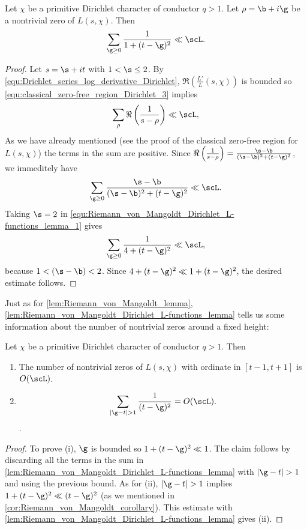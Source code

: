       \begin{lemma}\label{lem:Riemann_von_Mangoldt_Dirichlet_L-functions_lemma}
        Let $\chi$ be a primitive Dirichlet character of conductor $q > 1$. Let $\rho = \b+i\g$ be a nontrivial zero of $L(s,\chi)$. Then
        \[
          \sum_{\g \ge 0}\frac{1}{1+(t-\g)^{2}} \ll \scL.
        \]
      \end{lemma}
      \begin{proof}
        Let $s = \s+it$ with $1 < \s \le 2$. By \cref{equ:Drichlet_series_log_derivative_Dirichlet}, $\Re\left(\frac{L'}{L}(s,\chi)\right)$ is bounded so \cref{equ:classical_zero-free_region_Dirichlet_3} implies
        \[
          \sum_{\rho}\Re\left(\frac{1}{s-\rho}\right) \ll \scL,
        \]
        As we have already mentioned (see the proof of the classical zero-free region for $L(s,\chi)$) the terms in the sum are positive. Since $\Re\left(\frac{1}{s-\rho}\right) = \frac{\s-\b}{(\s-\b)^{2}+(t-\g)^{2}}$, we immeditely have
        \begin{equation}\label{equ:Riemann_von_Mangoldt_Dirichlet_L-functions_lemma_1}
          \sum_{\g \ge 0}\frac{\s-\b}{(\s-\b)^{2}+(t-\g)^{2}} \ll \scL.
        \end{equation}
        Taking $\s = 2$ in \cref{equ:Riemann_von_Mangoldt_Dirichlet_L-functions_lemma_1} gives
        \[
          \sum_{\g \ge 0}\frac{1}{4+(t-\g)^{2}} \ll \scL,
        \]
        because $1 < (\s-\b) < 2$. Since $4+(t-\g)^{2} \ll 1+(t-\g)^{2}$, the desired estimate follows.
      \end{proof}

      Just as for \cref{lem:Riemann_von_Mangoldt_lemma}, \cref{lem:Riemann_von_Mangoldt_Dirichlet_L-functions_lemma} tells us some information about the number of nontrivial zeros around a fixed height:

      \begin{corollary}\label{cor:Riemann_von_Mangoldt_Dirichlet_L-functions_corollary}
        Let $\chi$ be a primitive Dirichlet character of conductor $q > 1$. Then
        \begin{enumerate}[label=(\roman*)]
          \item The number of nontrivial zeros of $L(s,\chi)$ with ordinate in $[t-1,t+1]$ is $O(\scL)$.
          \item 
          \[
            \sum_{|\g-t| > 1}\frac{1}{(t-\g)^{2}} = O(\scL).
          \].
        \end{enumerate}
      \end{corollary}
      \begin{proof}
        To prove (i), $\g$ is bounded so $1+(t-\g)^{2} \ll 1$. The claim follows by discarding all the terms in the sum in \cref{lem:Riemann_von_Mangoldt_Dirichlet_L-functions_lemma} with $|\g-t| > 1$ and using the previous bound. As for (ii), $|\g-t| > 1$ implies $1+(t-\g)^{2} \ll (t-\g)^{2}$ (as we mentioned in \cref{cor:Riemann_von_Mangoldt_corollary}). This estimate with \cref{lem:Riemann_von_Mangoldt_Dirichlet_L-functions_lemma} gives (ii).
      \end{proof}

